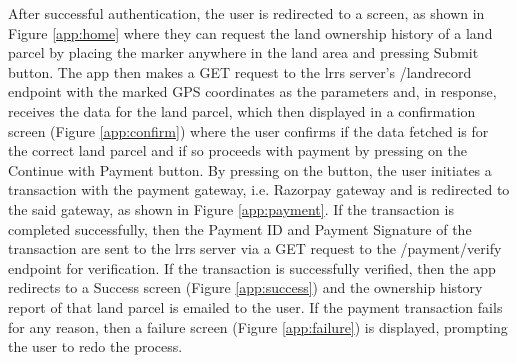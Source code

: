 \documentclass{article}
\begin{document}
        After successful authentication, the user is redirected to a screen, as shown in Figure \ref{app:home} where they can request the land ownership history of a land parcel by placing the marker anywhere in the land area and pressing Submit button. The app then makes a GET request to the \gls{lrrs} server's /landrecord endpoint with the marked GPS coordinates as the parameters and, in response, receives the data for the land parcel, which then displayed in a confirmation screen (Figure \ref{app:confirm}) where the user confirms if the data fetched is for the correct land parcel and if so proceeds with payment by pressing on the Continue with Payment button. By pressing on the button, the user initiates a transaction with the payment gateway, i.e. Razorpay gateway and is redirected to the said gateway, as shown in Figure \ref{app:payment}. If the transaction is completed successfully, then the Payment ID and Payment Signature of the transaction are sent to the \gls{lrrs} server via a GET request to the /payment/verify endpoint for verification. If the transaction is successfully verified, then the app redirects to a Success screen (Figure \ref{app:success}) and the ownership history report of that land parcel is emailed to the user. If the payment transaction fails for any reason, then a failure screen (Figure \ref{app:failure}) is displayed, prompting the user to redo the process.
        
\end{document}
